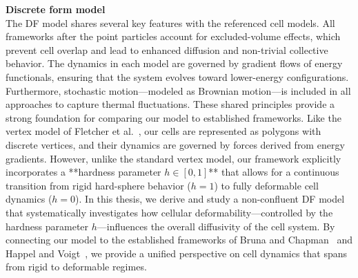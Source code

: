\textbf{Discrete form model} \\ 
The DF model shares several key features with the referenced cell models. 
All frameworks after the point particles account for excluded-volume effects, which prevent cell overlap and lead to enhanced diffusion and non-trivial collective behavior. 
The dynamics in each model are governed by gradient flows of energy functionals, ensuring that the system evolves toward lower-energy configurations. 
Furthermore, stochastic motion—modeled as Brownian motion—is included in all approaches to capture thermal fluctuations. 
These shared principles provide a strong foundation for comparing our model to established frameworks.
Like the vertex model of Fletcher et al.~\cite{Fletcher14}, our cells are represented as polygons with discrete vertices, and their dynamics are governed by forces derived from energy gradients. 
However, unlike the standard vertex model, our framework explicitly incorporates a **hardness parameter $h \in [0,1]$** that allows for a continuous transition from rigid hard-sphere behavior ($h=1$) to fully deformable cell dynamics ($h=0$).
In this thesis, we derive and study a non-confluent DF model that systematically investigates how cellular deformability—controlled by the hardness parameter $h$—influences the overall diffusivity of the cell system. 
By connecting our model to the established frameworks of Bruna and Chapman~\cite{Bruna2012, Bruna2017} and Happel and Voigt~\cite{Happel2023}, we provide a unified perspective on cell dynamics that spans from rigid to deformable regimes.



